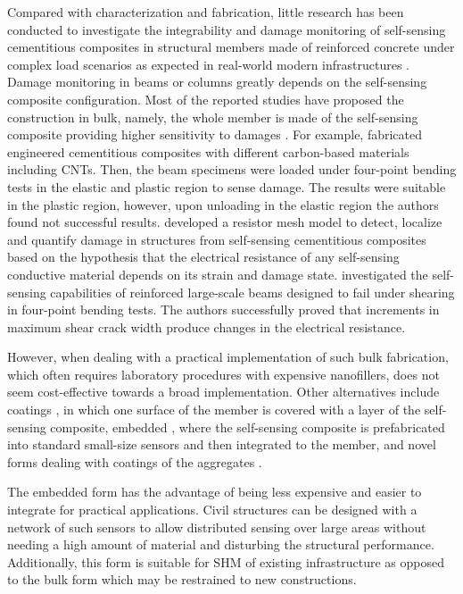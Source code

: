 \documentclass[twocolumn]{bmcart}%
\begin{document}
Compared with characterization and fabrication, little research has been conducted to investigate the integrability and damage monitoring of self-sensing cementitious composites in structural members made of reinforced concrete under complex load scenarios as expected in real-world modern infrastructures \cite{Lagason2016, You2017, Al-Dahawi2017a, Naeem2017a}. Damage monitoring in beams or columns greatly depends on the self-sensing composite configuration. 
Most of the reported studies have proposed the construction in bulk, namely, the whole member is made of the self-sensing composite providing higher sensitivity to damages \cite{Hannan2018a, Lagason2016, Al-Dahawi2017a, Downey2017a, Gupta2017a, You2017, Yldrm2018}. For example, \cite{Al-Dahawi2017a} fabricated engineered cementitious composites with different carbon-based materials including CNTs. Then, the beam specimens were loaded under four-point bending tests in the elastic and plastic region to sense damage. The results were suitable in the plastic region, however, upon unloading in the elastic region the authors found not successful results. \cite{Downey2017} developed a resistor mesh model to detect, localize and quantify damage in structures from self-sensing cementitious composites based on the hypothesis that the electrical resistance of any self-sensing conductive material depends on its strain and damage state. \cite{Yldrm2018} investigated the self-sensing capabilities of reinforced large-scale beams designed to fail under shearing in four-point bending tests. The authors successfully proved that increments in maximum shear crack width produce changes in the electrical resistance.

However, when dealing with a practical implementation of such bulk fabrication, which often requires laboratory procedures with expensive nanofillers, does not seem cost-effective towards a broad implementation. Other alternatives include coatings \cite{Downey2017, Downey2018e, Nespor2018a}, in which one surface of the member is covered with a layer of the self-sensing composite, embedded \cite{Meoni2018a, Saafi2009, DAlessandro2017}, where the self-sensing composite is prefabricated into standard small-size sensors and then integrated to the member, and novel forms dealing with coatings of the aggregates \cite{Han2015b, Gupta2017a, Loh2015a}.

The embedded form has the advantage of being less expensive and easier to integrate for practical applications. Civil structures can be designed with a network of such sensors to allow distributed sensing over large areas without needing a high amount of material and disturbing the structural performance. Additionally, this form is suitable for SHM of existing infrastructure as opposed to the bulk form which may be restrained to new constructions. 
\end{document}

